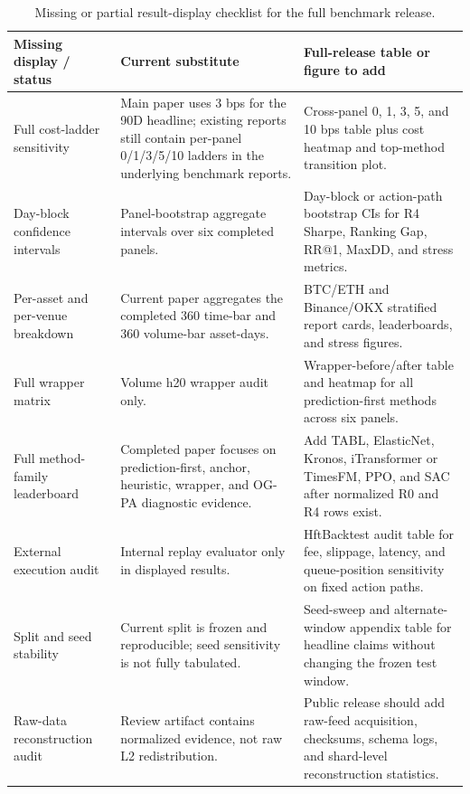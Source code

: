 \begin{table}[t]
\centering
\caption{Missing or partial result-display checklist for the full benchmark release.}
\label{tab:table_22_missing_display}
\begin{tabular}{lll}
\toprule
Missing display / status & Current substitute & Full-release table or figure to add \\
\midrule
Full cost-ladder sensitivity & Main paper uses 3 bps for the 90D headline; existing reports still contain per-panel 0/1/3/5/10 ladders in the underlying benchmark reports. & Cross-panel 0, 1, 3, 5, and 10 bps table plus cost heatmap and top-method transition plot. \\
Day-block confidence intervals & Panel-bootstrap aggregate intervals over six completed panels. & Day-block or action-path bootstrap CIs for R4 Sharpe, Ranking Gap, RR@1, MaxDD, and stress metrics. \\
Per-asset and per-venue breakdown & Current paper aggregates the completed 360 time-bar and 360 volume-bar asset-days. & BTC/ETH and Binance/OKX stratified report cards, leaderboards, and stress figures. \\
Full wrapper matrix & Volume h20 wrapper audit only. & Wrapper-before/after table and heatmap for all prediction-first methods across six panels. \\
Full method-family leaderboard & Completed paper focuses on prediction-first, anchor, heuristic, wrapper, and OG-PA diagnostic evidence. & Add TABL, ElasticNet, Kronos, iTransformer or TimesFM, PPO, and SAC after normalized R0 and R4 rows exist. \\
External execution audit & Internal replay evaluator only in displayed results. & HftBacktest audit table for fee, slippage, latency, and queue-position sensitivity on fixed action paths. \\
Split and seed stability & Current split is frozen and reproducible; seed sensitivity is not fully tabulated. & Seed-sweep and alternate-window appendix table for headline claims without changing the frozen test window. \\
Raw-data reconstruction audit & Review artifact contains normalized evidence, not raw L2 redistribution. & Public release should add raw-feed acquisition, checksums, schema logs, and shard-level reconstruction statistics. \\
\bottomrule
\end{tabular}
\end{table}
